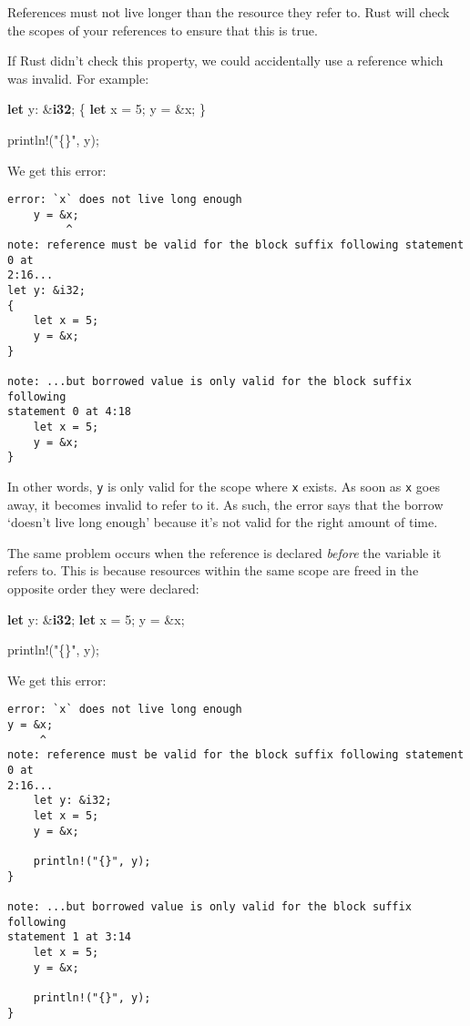 \documentclass[a4paper,]{book}
\newenvironment{Shaded}{\begin{snugshade}}{\end{snugshade}}
\newcommand{\KeywordTok}[1]{\textcolor[rgb]{0.13,0.29,0.53}{\textbf{{#1}}}}
\newcommand{\DecValTok}[1]{\textcolor[rgb]{0.00,0.00,0.81}{{#1}}}
\newcommand{\StringTok}[1]{\textcolor[rgb]{0.31,0.60,0.02}{{#1}}}
\newcommand{\OtherTok}[1]{\textcolor[rgb]{0.56,0.35,0.01}{{#1}}}
\newcommand{\NormalTok}[1]{{#1}}
\begin{document}
References must not live longer than the resource they refer to. Rust
will check the scopes of your references to ensure that this is true.

If Rust didn't check this property, we could accidentally use a
reference which was invalid. For example:

\begin{Shaded}
\begin{Highlighting}[]
\KeywordTok{let} \NormalTok{y: &}\KeywordTok{i32}\NormalTok{;}
\NormalTok{\{}
    \KeywordTok{let} \NormalTok{x = }\DecValTok{5}\NormalTok{;}
    \NormalTok{y = &x;}
\NormalTok{\}}

\OtherTok{println!}\NormalTok{(}\StringTok{"\{\}"}\NormalTok{, y);}
\end{Highlighting}
\end{Shaded}

We get this error:

\begin{verbatim}
error: `x` does not live long enough
    y = &x;
         ^
note: reference must be valid for the block suffix following statement 0 at
2:16...
let y: &i32;
{
    let x = 5;
    y = &x;
}

note: ...but borrowed value is only valid for the block suffix following
statement 0 at 4:18
    let x = 5;
    y = &x;
}
\end{verbatim}

In other words, \texttt{y} is only valid for the scope where \texttt{x}
exists. As soon as \texttt{x} goes away, it becomes invalid to refer to
it. As such, the error says that the borrow `doesn't live long enough'
because it's not valid for the right amount of time.

The same problem occurs when the reference is declared \emph{before} the
variable it refers to. This is because resources within the same scope
are freed in the opposite order they were declared:

\begin{Shaded}
\begin{Highlighting}[]
\KeywordTok{let} \NormalTok{y: &}\KeywordTok{i32}\NormalTok{;}
\KeywordTok{let} \NormalTok{x = }\DecValTok{5}\NormalTok{;}
\NormalTok{y = &x;}

\OtherTok{println!}\NormalTok{(}\StringTok{"\{\}"}\NormalTok{, y);}
\end{Highlighting}
\end{Shaded}

We get this error:

\begin{verbatim}
error: `x` does not live long enough
y = &x;
     ^
note: reference must be valid for the block suffix following statement 0 at
2:16...
    let y: &i32;
    let x = 5;
    y = &x;

    println!("{}", y);
}

note: ...but borrowed value is only valid for the block suffix following
statement 1 at 3:14
    let x = 5;
    y = &x;

    println!("{}", y);
}
\end{verbatim}
\end{document}
